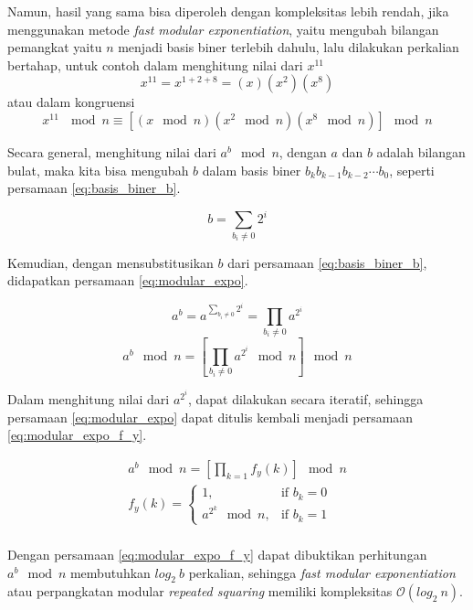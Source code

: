 Namun, hasil yang sama bisa diperoleh dengan kompleksitas lebih rendah, jika menggunakan metode \textit{fast modular exponentiation}, yaitu mengubah bilangan pemangkat yaitu $ n $ menjadi basis biner terlebih dahulu, lalu dilakukan perkalian bertahap, untuk contoh dalam menghitung nilai dari $ x^{11} $
$$ x^{11} = x^{1+2+8} = (x)(x^{2})(x^{8}) $$
atau dalam kongruensi 
$$ x^{11}\ \mod{n} \equiv [(x\mod{n})(x^{2}\mod{n})(x^{8}\mod{n})]\mod{n} $$

Secara general, menghitung nilai dari $ a^b\mod{n} $, dengan $ a $ dan $ b $ adalah bilangan bulat, maka kita bisa mengubah $ b $ dalam basis biner $b_{k} b_{k-1} b_{k-2} \cdots b_{0}$, seperti persamaan \eqref{eq:basis_biner_b}.

\begin{equation}
	b = \sum_{b_i \neq 0} 2^i
	\label{eq:basis_biner_b}
\end{equation}

Kemudian, dengan mensubstitusikan $ b $ dari persamaan \eqref{eq:basis_biner_b}, didapatkan persamaan \eqref{eq:modular_expo}.

$$ a^b = a^{\sum_{b_i \neq 0} 2^i} = \prod_{b_i \neq 0} a^{2^{i}} $$
\begin{equation}
	a^b\mod{n} = \left [ \prod_{b_i \neq 0} a^{2^{i}} \mod{n} \right ] \mod{n}
	\label{eq:modular_expo}
\end{equation}

Dalam menghitung nilai dari $ a^{2^{i}} $, dapat dilakukan secara iteratif, sehingga persamaan \eqref{eq:modular_expo} dapat ditulis kembali menjadi persamaan \eqref{eq:modular_expo_f_y}.

\begin{equation}
	\begin{aligned}
	a^b\mod{n} = \left [ \prod_{k = 1} f_y(k)\right ] \mod{n} \\
	f_y(k)=
		\begin{cases}
			1,  					& \text{if } b_k=0 \\
			a^{2^{k}}  \mod{n} ,   & \text{if } b_k=1
		\end{cases} \\
	\end{aligned}
	\label{eq:modular_expo_f_y}
\end{equation}


Dengan persamaan \eqref{eq:modular_expo_f_y} dapat dibuktikan perhitungan $ a^b \mod{n} $ membutuhkan $ log_2\ b $ perkalian, sehingga \textit{fast modular exponentiation} atau perpangkatan modular \textit{repeated squaring} memiliki kompleksitas $ \mathcal{O}{(log_2\ n)} $. 

